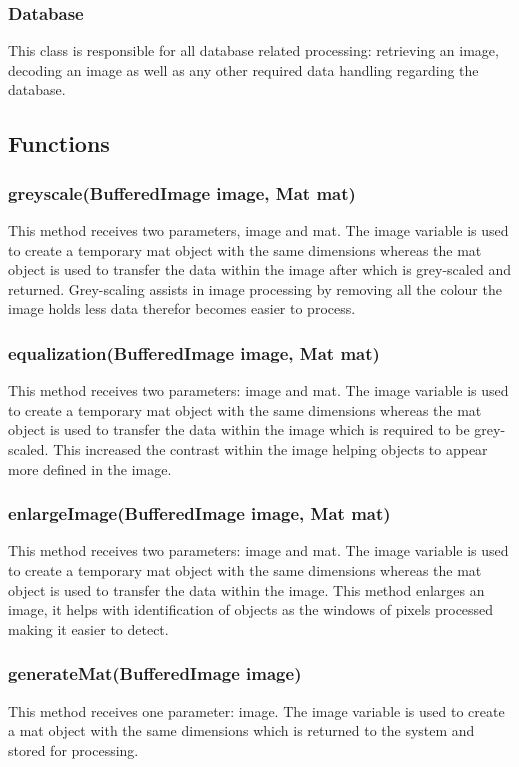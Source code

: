 \documentclass[a4paper,12pt]{report}
\begin{document}
\subsubsection{Database}
This class is responsible for all database related processing: retrieving an image, decoding an image as well as any other required data handling regarding the database.

\subsection{Functions}
\subsubsection{greyscale(BufferedImage image, Mat mat)}
This method receives two parameters, image and mat. The image variable is used to
create a temporary mat object with the same dimensions whereas the mat object is used
to transfer the data within the image after which is grey-scaled and returned.
Grey-scaling assists in image processing by removing all the colour the image holds less
data therefor becomes easier to process.
\subsubsection{equalization(BufferedImage image, Mat mat)}
This method receives two parameters: image and mat. The image variable is used to
create a temporary mat object with the same dimensions whereas the mat object is used
to transfer the data within the image which is required to be grey-scaled.
This increased the contrast within the image helping objects to appear more defined in
the image.
\subsubsection{enlargeImage(BufferedImage image, Mat mat)}
This method receives two parameters: image and mat. The image variable is used to
create a temporary mat object with the same dimensions whereas the mat object is used
to transfer the data within the image.
This method enlarges an image, it helps with identification of objects as the windows of
pixels processed making it easier to detect.
\subsubsection{generateMat(BufferedImage image)}
This method receives one parameter: image. The image variable is used to create a mat
object with the same dimensions which is returned to the system and stored for
processing.
\end{document}
